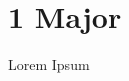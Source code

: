 \documentclass[tom-ari]{subfile}
\begin{document}
	
	\chapter{1 Major}
	
	Lorem Ipsum
	
	\lipsum[4]
	
\end{document}

